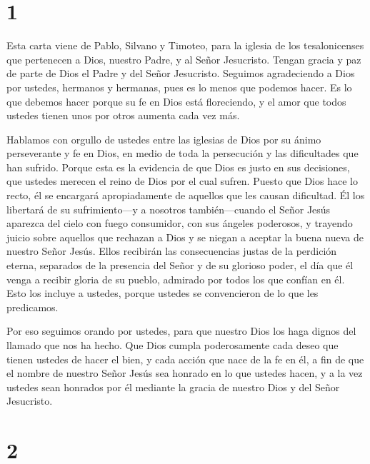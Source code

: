 \hypertarget{section}{%
\section{1}\label{section}}

 Esta carta viene de Pablo, Silvano y Timoteo, para la
iglesia de los tesalonicenses que pertenecen a Dios, nuestro Padre, y al
Señor Jesucristo.  Tengan gracia y paz de parte de Dios el
Padre y del Señor Jesucristo.  Seguimos agradeciendo a Dios
por ustedes, hermanos y hermanas, pues es lo menos que podemos hacer. Es
lo que debemos hacer porque su fe en Dios está floreciendo, y el amor
que todos ustedes tienen unos por otros aumenta cada vez más.

 Hablamos con orgullo de ustedes entre las iglesias de Dios
por su ánimo perseverante y fe en Dios, en medio de toda la persecución
y las dificultades que han sufrido.  Porque esta es la
evidencia de que Dios es justo en sus decisiones, que ustedes merecen el
reino de Dios por el cual sufren.  Puesto que Dios hace lo
recto, él se encargará apropiadamente de aquellos que les causan
dificultad.  Él los libertará de su sufrimiento---y a
nosotros también---cuando el Señor Jesús aparezca del cielo con fuego
consumidor, con sus ángeles poderosos,  y trayendo juicio
sobre aquellos que rechazan a Dios y se niegan a aceptar la buena nueva
de nuestro Señor Jesús.  Ellos recibirán las consecuencias
justas de la perdición eterna, separados de la presencia del Señor y de
su glorioso poder,  el día que él venga a recibir gloria de
su pueblo, admirado por todos los que confían en él. Esto los incluye a
ustedes, porque ustedes se convencieron de lo que les predicamos.

 Por eso seguimos orando por ustedes, para que nuestro Dios
los haga dignos del llamado que nos ha hecho. Que Dios cumpla
poderosamente cada deseo que tienen ustedes de hacer el bien, y cada
acción que nace de la fe en él,  a fin de que el nombre de
nuestro Señor Jesús sea honrado en lo que ustedes hacen, y a la vez
ustedes sean honrados por él mediante la gracia de nuestro Dios y del
Señor Jesucristo.

\hypertarget{section-1}{%
\section{2}\label{section-1}}

